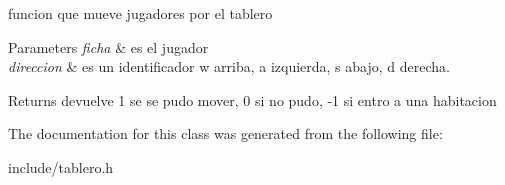 funcion que mueve jugadores por el tablero 


\begin{DoxyParams}{Parameters}
{\em ficha} & es el jugador \\
\hline
{\em direccion} & es un identificador w arriba, a izquierda, s abajo, d derecha. \\
\hline
\end{DoxyParams}
\begin{DoxyReturn}{Returns}
devuelve 1 se se pudo mover, 0 si no pudo, -\/1 si entro a una habitacion 
\end{DoxyReturn}


The documentation for this class was generated from the following file\+:\begin{DoxyCompactItemize}
\item 
include/tablero.\+h\end{DoxyCompactItemize}
